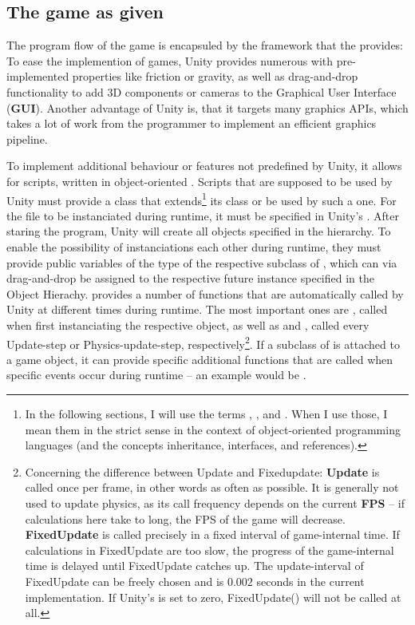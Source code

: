 \subsection{The game as given}
\label{ch:gamedescription}

The program flow of the game is encapsuled by the framework that the  provides: To ease the implemention of games, Unity provides numerous  with pre-implemented properties like friction or gravity, as well as drag-and-drop functionality to add 3D components or cameras to the Graphical User Interface (\textbf{GUI}). Another advantage of Unity is, that it targets many graphics APIs, which takes a lot of work from the programmer to implement an efficient graphics pipeline.

To implement additional behaviour or features not predefined by Unity, it allows for scripts, written in object-oriented . Scripts that are supposed to be used by Unity must provide a class that extends\footnote{In the following sections, I will use the terms , ,  and . When I use those, I mean them in the strict sense in the context of object-oriented programming languages (and the concepts inheritance, interfaces, and references).} its class  or be used by such a one. 
For the file to be instanciated during runtime, it must be specified in Unity's . After staring the program, Unity will create all objects specified in the hierarchy. To enable the possibility of instanciations  each other during runtime, they must provide public variables of the type of the respective subclass of , which can via drag-and-drop be assigned to the respective future instance specified in the Object Hierachy.  provides a number of functions that are automatically called by Unity at different times during runtime. The most important ones are , called when first instanciating the respective object, as well as  and , called every Update-step or Physics-update-step, respectively\footnote{Concerning the difference between Update and Fixedupdate: \textbf{Update} is called once per frame, in other words as often as possible. It is generally not used to update physics, as its call frequency depends on the current \textbf{FPS} -- if calculations here take to long, the FPS of the game will decrease. \textbf{FixedUpdate} is called precisely in a fixed interval of game-internal time. If calculations in FixedUpdate are too slow, the progress of the game-internal time is delayed until FixedUpdate catches up. The update-interval of FixedUpdate can be freely chosen and is $0.002$ seconds in the current implementation. If Unity's  is set to zero, FixedUpdate() will not be called at all.}. If a subclass of  is attached to a game object, it can provide specific additional functions that are called when specific events occur during runtime -- an example would be .\\

